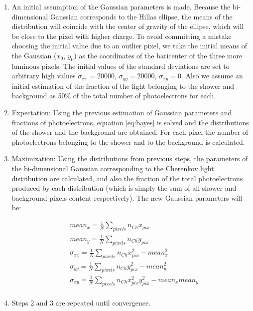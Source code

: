 \documentclass[main.tex]{subfiles}
\begin{document}
\begin{enumerate}
  \item An initial assumption of the Gaussian parameters is made. Because the bi-dimensional Gaussian corresponds to the Hillas ellipse, the means of the distribution will coincide with the center of gravity of the ellipse, which will be close to the pixel with higher charge. To avoid committing a mistake choosing the initial value due to an outlier pixel, we take the initial means of the Gaussian ($x_0$, $y_0$) as the coordinates of the baricenter of the three more luminous pixels. The initial values of the standard deviations are set to arbitrary high values $\sigma_{xx}=20000$, $\sigma_{yy}=20000$, $\sigma_{xy}=0$. Also we assume an initial estimation of the fraction of the light belonging to the shower and background as 50\% of the total number of photoelectrons for each.

  \item Expectation: Using the previous estimation of Gaussian parameters and fractions of photoelectrons, equation \ref{eq:bayes} is solved and the distributions of the shower and the background are obtained. For each pixel the number of photoelectrons belonging to the shower and to the background is calculated.

  \item Maximization: Using the distributions from previous steps, the parameters of the bi-dimensional Gaussian corresponding to the Cherenkov light distribution are calculated, and also the fraction of the total photoelectrons produced by each distribution (which is simply the sum of all shower and background pixels content respectively). The new Gaussian parameters will be:

    \begin{equation}
      \begin{split}
        & mean_{x} = \frac{1}{N}\sum_{pixels} n_{Ch} x_{pix}\\
        & mean_{y} = \frac{1}{N}\sum_{pixels} n_{Ch} y_{pix}\\
        & \sigma_{xx} = \frac{1}{N}\sum_{pixels} n_{Ch} x_{pix}^{2} - mean_{x}^2\\
        & \sigma_{yy} = \frac{1}{N}\sum_{pixels} n_{Ch} y_{pix}^{2} - mean_{y}^2\\
        & \sigma_{xy} = \frac{1}{N}\sum_{pixels} n_{Ch} x_{pix}^{2} y_{pix}^{2} - mean_{x}mean_{y}\\
      \end{split}
    \end{equation}
  \item Steps 2 and 3 are repeated until convergence.\\
    
\end{enumerate}
\end{document}
